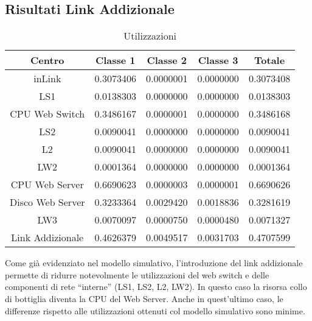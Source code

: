 \subsection{Risultati Link Addizionale}
\begin{table}[htbp]
\begin{center}
\begin{tabular}{|c|c|c|c|c|}
\hline
Centro	&Classe 1	&Classe 2	&Classe 3 &Totale\\
\hline
\hline
inLink & 0.3073406 & 0.0000001 & 0.0000000 & 0.3073408 \\ \hline
LS1 & 0.0138303 & 0.0000000 & 0.0000000 & 0.0138303 \\ \hline
CPU Web Switch & 0.3486167 & 0.0000001 & 0.0000000 & 0.3486168 \\ \hline
LS2 & 0.0090041 & 0.0000000 & 0.0000000 & 0.0090041 \\ \hline
L2 & 0.0090041 & 0.0000000 & 0.0000000 & 0.0090041 \\ \hline
LW2 & 0.0001364 & 0.0000000 & 0.0000000 & 0.0001364 \\ \hline
CPU Web Server & 0.6690623 & 0.0000003 & 0.0000001 & 0.6690626 \\ \hline
Disco Web Server & 0.3233364 & 0.0029420 & 0.0018836 & 0.3281619 \\ \hline
LW3 & 0.0070097 & 0.0000750 & 0.0000480 & 0.0071327 \\ \hline
Link Addizionale & 0.4626379 & 0.0049517 & 0.0031703 & 0.4707599 \\ \hline
\end{tabular}
\end{center}
\caption{Utilizzazioni}
\label{utilizzazioni}
\end{table}
Come già evidenziato nel modello simulativo, l'introduzione del link addizionale permette di ridurre notevolmente le utilizzazioni del web switch e delle componenti di rete “interne” (LS1, LS2, L2, LW2). In questo caso la risorsa collo di bottiglia diventa la CPU del Web Server. Anche in quest'ultimo caso, le differenze rispetto alle utilizzazioni  ottenuti col modello simulativo sono minime.
